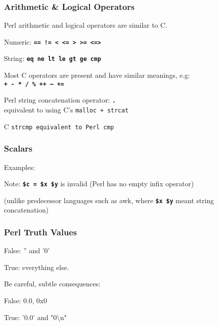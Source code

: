 \begin{frame}
\frametitle{Arithmetic \& Logical Operators}

Perl arithmetic and logical operators are similar to C.

Numeric: \textbf{\tt{==  !=  <  <=  >  >=  <=>}}

String: \textbf{\tt{eq  ne  lt  le  gt  ge  cmp}}

Most C operators are present and have similar meanings, e.g: \\
\textbf{\tt{+ - * / \% ++ -- += }}

Perl string concatenation operator: \textbf{\tt{.}} \\
equivalent to using C's \tt{malloc} + \tt{strcat}

C \tt{strcmp} equivalent to Perl cmp

\end{frame}

\begin{frame}
\frametitle{Scalars}
Examples:

Note: \textbf{\tt{\$c = \$x \$y}} is invalid
{\small (Perl has no empty infix operator)}

{\small (unlike predecessor languages such as awk, where \textbf{\tt{\$x \$y}} meant string concatenation)}
\end{frame}

\begin{frame}
\frametitle{ Perl Truth Values}

False: '' and '0'

True: everything else.

Be careful, subtle consequences:

False: 0.0, 0x0

True: '0.0' and "0{\textbackslash}n"


\end{frame}


